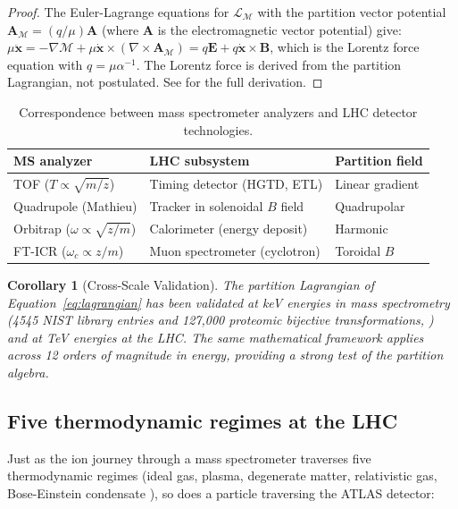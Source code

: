 \documentclass[twocolumn,10pt,a4paper]{article}
\theoremstyle{thmstyle}
\newtheorem{corollary}[theorem]{Corollary}
\theoremstyle{definition}
\theoremstyle{remark}
\begin{document}
\begin{proof}
The Euler-Lagrange equations for $\mathcal{L}_\mathcal{M}$ with the
partition vector potential $\mathbf{A}_\mathcal{M} = (q/\mu)\mathbf{A}$
(where $\mathbf{A}$ is the electromagnetic vector potential) give:
$\mu\ddot{\mathbf{x}} = -\nabla\mathcal{M} + \mu\dot{\mathbf{x}}
\times (\nabla\times\mathbf{A}_\mathcal{M})
= q\mathbf{E} + q\dot{\mathbf{x}}\times\mathbf{B}$,
which is the Lorentz force equation with $q = \mu\alpha^{-1}$.
The Lorentz force is derived from the partition Lagrangian, not postulated.
See \citet{companion:ion} for the full derivation.
\end{proof}

\begin{table}[h]
\centering\small
\caption{Correspondence between mass spectrometer analyzers and
LHC detector technologies.}
\label{tab:correspondence}
\begin{tabular}{lll}
\toprule
MS analyzer & LHC subsystem & Partition field \\
\midrule
TOF ($T \propto \sqrt{m/z}$) & Timing detector (HGTD, ETL) & Linear gradient \\
Quadrupole (Mathieu) & Tracker in solenoidal $B$ field & Quadrupolar \\
Orbitrap ($\omega \propto \sqrt{z/m}$) & Calorimeter (energy deposit) & Harmonic \\
FT-ICR ($\omega_c \propto z/m$) & Muon spectrometer (cyclotron) & Toroidal $B$ \\
\bottomrule
\end{tabular}
\end{table}

\begin{corollary}[Cross-Scale Validation]
The partition Lagrangian of Equation~\eqref{eq:lagrangian} has been validated
at keV energies in mass spectrometry (4545 NIST library entries and
127,000 proteomic bijective transformations, \citealt{companion:ion})
and at TeV energies at the LHC. The same mathematical framework
applies across 12 orders of magnitude in energy, providing a strong
test of the partition algebra.
\end{corollary}

\subsection{Five thermodynamic regimes at the LHC}

Just as the ion journey through a mass spectrometer traverses five
thermodynamic regimes (ideal gas, plasma, degenerate matter, relativistic
gas, Bose-Einstein condensate \citep{companion:regimes}), so does a particle
traversing the ATLAS detector:
\end{document}
